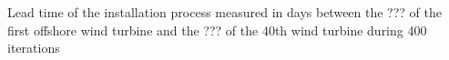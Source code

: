 \label{fig:iterations}
Lead time of the installation process measured in days between the ??? of the first offshore wind turbine and the ??? of the 40th wind turbine during 400 iterations